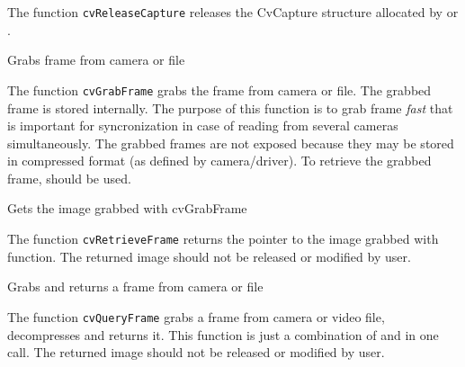 The function \texttt{cvReleaseCapture} releases the CvCapture structure allocated by  or .


Grabs frame from camera or file


\begin{description}
\end{description}

The function \texttt{cvGrabFrame} grabs the frame from camera or file. The grabbed frame is stored internally. The purpose of this function is to grab frame \emph{fast} that is important for syncronization in case of reading from several cameras simultaneously. The grabbed frames are not exposed because they may be stored in compressed format (as defined by camera/driver). To retrieve the grabbed frame,  should be used.


Gets the image grabbed with cvGrabFrame


\begin{description}
\end{description}

The function \texttt{cvRetrieveFrame} returns the pointer to the image grabbed with  function. The returned image should not be released or modified by user.


Grabs and returns a frame from camera or file


\begin{description}
\end{description}

The function \texttt{cvQueryFrame} grabs a frame from camera or video file, decompresses and returns it. This function is just a combination of  and  in one call. The returned image should not be released or modified by user.

